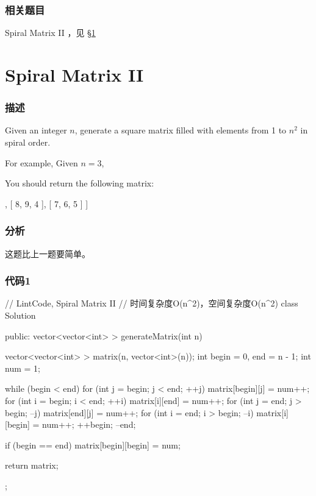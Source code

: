 \subsubsection{相关题目}
\begindot
\item Spiral Matrix II ，见 \S \ref{sec:spiral-matrix-ii}
\myenddot


\section{Spiral Matrix II} %
\label{sec:spiral-matrix-ii}


\subsubsection{描述}
Given an integer $n$, generate a square matrix filled with elements from 1 to $n^2$ in spiral order.

For example,
Given $n = 3$,

You should return the following matrix:
\begin{Code}
[
 [ 1, 2, 3 ],
 [ 8, 9, 4 ],
 [ 7, 6, 5 ]
]
\end{Code}


\subsubsection{分析}
这题比上一题要简单。


\subsubsection{代码1}
\begin{Code}
// LintCode, Spiral Matrix II
// 时间复杂度O(n^2)，空间复杂度O(n^2)
class Solution {
public:
    vector<vector<int> > generateMatrix(int n) {
        vector<vector<int> > matrix(n, vector<int>(n));
        int begin = 0, end = n - 1;
        int num = 1;

        while (begin < end) {
            for (int j = begin; j < end; ++j) matrix[begin][j] = num++;
            for (int i = begin; i < end; ++i) matrix[i][end] = num++;
            for (int j = end; j > begin; --j) matrix[end][j] = num++;
            for (int i = end; i > begin; --i) matrix[i][begin] = num++;
            ++begin;
            --end;
        }

        if (begin == end) matrix[begin][begin] = num;

        return matrix;
    }
};
\end{Code}



